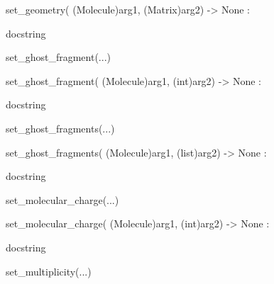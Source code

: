 \documentclass[letterpaper,10pt,english]{sphinxmanual}
\begin{document}
\begin{description}
\begin{description}
\begin{DUlineblock}{0em}
\begin{DUlineblock}{\DUlineblockindent}
\item[] set\_geometry( (Molecule)arg1, (Matrix)arg2) -\textgreater{} None :
\item[]
\begin{DUlineblock}{\DUlineblockindent}
\item[] docstring
\item[] 
\end{DUlineblock}
\end{DUlineblock}
\item[] set\_ghost\_fragment(...)
\item[]
\begin{DUlineblock}{\DUlineblockindent}
\item[] set\_ghost\_fragment( (Molecule)arg1, (int)arg2) -\textgreater{} None :
\item[]
\begin{DUlineblock}{\DUlineblockindent}
\item[] docstring
\item[] 
\end{DUlineblock}
\end{DUlineblock}
\item[] set\_ghost\_fragments(...)
\item[]
\begin{DUlineblock}{\DUlineblockindent}
\item[] set\_ghost\_fragments( (Molecule)arg1, (list)arg2) -\textgreater{} None :
\item[]
\begin{DUlineblock}{\DUlineblockindent}
\item[] docstring
\item[] 
\end{DUlineblock}
\end{DUlineblock}
\item[] set\_molecular\_charge(...)
\item[]
\begin{DUlineblock}{\DUlineblockindent}
\item[] set\_molecular\_charge( (Molecule)arg1, (int)arg2) -\textgreater{} None :
\item[]
\begin{DUlineblock}{\DUlineblockindent}
\item[] docstring
\item[] 
\end{DUlineblock}
\end{DUlineblock}
\item[] set\_multiplicity(...)
\item[]

\end{DUlineblock}
\end{description}
\end{description}
\end{document}

